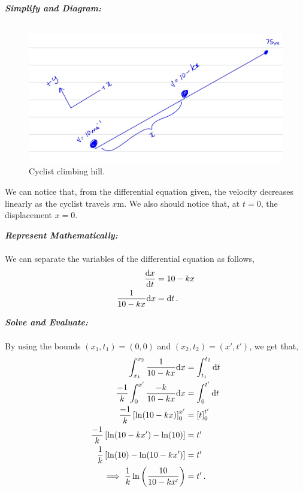 \begin{subquestions}
\begin{subsubquestions}
\textbf{\textit{Simplify and Diagram:}} \\ \\
\begin{figure}[H]
	\begin{center}
		\includegraphics[scale=0.25]{../2013/figures/2013q5-3}
		\caption{\label{2013:q5:Diagram3} Cyclist climbing hill.}
	\end{center}
\end{figure}
We can notice that, from the differential equation given, the velocity decreases linearly as the cyclist travels $x$m. We also should notice that, at $t=0$, the displacement $x=0$.




\textbf{\textit{Represent Mathematically:}} \\ \\
We can separate the variables of the differential equation as follows,
\begin{align}
	\frac{\mathrm{d}x}{\mathrm{d}t} & = 10-kx \nonumber \\
	\frac{1}{10-kx}\mathrm{d} x & = \mathrm{d} t \,.
\end{align}




\textbf{\textit{Solve and Evaluate:}} \\ \\
By using the bounds $(x_1,t_1)=(0,0)$ and $(x_2,t_2)=(x',t')$, we get that,
\begin{align}
	\int_{x_1}^{x_2}\frac{1}{10-kx}\mathrm{d} x & = \int_{t_1}^{t_2}\mathrm{d} t \nonumber \\
	\frac{-1}{k} \int_{0}^{x'}\frac{-k}{10-kx}\mathrm{d} x & = \int_{0}^{t'}\mathrm{d} t \nonumber \\
	\frac{-1}{k} \left[\ln(10-kx)\right]_0^{x'} & = \left[t\right]_0^{t'} \nonumber \\
	\frac{-1}{k} \left[\ln(10-kx')-\ln(10)\right] & = t' \nonumber \\
	\frac{1}{k} \left[\ln(10)-\ln(10-kx')\right] & = t' \nonumber \\
	\implies \frac{1}{k} \ln\left(\frac{10}{10-kx'}\right) & = t' \,.
\end{align}


\end{subsubquestions}
\end{subquestions}

